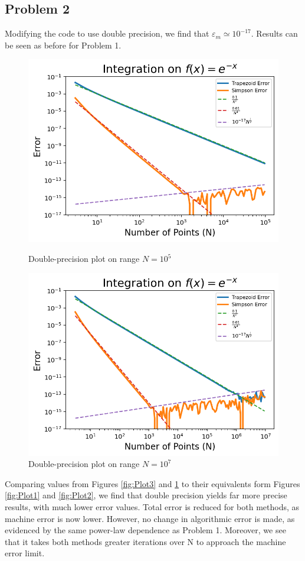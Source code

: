 \documentclass[aps,prb,groupedaddress,nofootinbib,floatfix]{revtex4}
\begin{document}
\subsection*{Problem 2}
Modifying the code to use double precision, we find that $\varepsilon_{m} \simeq 10^{-17}$. Results can be seen as before for Problem 1.
\begin{figure}
	\begin{minipage}[c]{0.4\linewidth}
		\includegraphics[width=\linewidth]{Plot2(10^5).png}
		\caption{Double-precision plot on range $N=10^{5}$ }
		\label{fig:Plot3}
	\end{minipage}
	\begin{minipage}[c]{0.4\linewidth}
		\includegraphics[width=\linewidth]{Plot2(10^7).png}
		\caption{Double-precision plot on range $N=10^{7}$ }
		\label{fig:Plot4}
	\end{minipage}
\end{figure}
Comparing values from Figures \ref{fig:Plot3} and \ref{fig:Plot4} to their equivalents form Figures \ref{fig:Plot1} and \ref{fig:Plot2}, we find that double precision yields far more precise results, with much lower error values. Total error is reduced for both methods, as machine error is now lower. However, no change in algorithmic error is made, as evidenced by the same power-law dependence as Problem 1. Moreover, we see that it takes both methods greater iterations over N to approach the machine error limit. 
\end{document}
